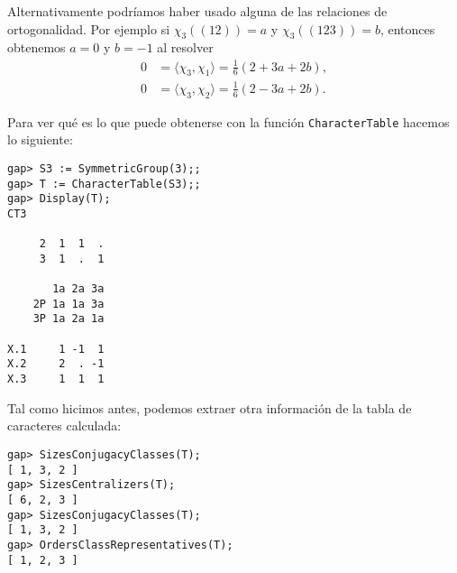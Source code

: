 \begin{example}
	Alternativamente podríamos haber usado alguna de las relaciones de
	ortogonalidad. Por ejemplo si $\chi_3( (12) )=a$ y $\chi_3( (123))=b$,
	entonces obtenemos $a=0$ y $b=-1$ al resolver 
	\begin{align*}
		0&=\langle \chi_3,\chi_1\rangle=\frac16(2+3a+2b),\\
		0&=\langle \chi_3,\chi_2\rangle=\frac16(2-3a+2b).
	\end{align*}
	
	Para ver qué es lo que puede obtenerse con la función \lstinline{CharacterTable} hacemos lo siguiente:
\begin{lstlisting}
gap> S3 := SymmetricGroup(3);;
gap> T := CharacterTable(S3);;
gap> Display(T);
CT3

     2  1  1  .
     3  1  .  1

       1a 2a 3a
    2P 1a 1a 3a
    3P 1a 2a 1a

X.1     1 -1  1
X.2     2  . -1
X.3     1  1  1
\end{lstlisting}
Tal como hicimos antes, podemos extraer otra información de la tabla de caracteres calculada:
\begin{lstlisting}
gap> SizesConjugacyClasses(T);
[ 1, 3, 2 ]
gap> SizesCentralizers(T);
[ 6, 2, 3 ]
gap> SizesConjugacyClasses(T);
[ 1, 3, 2 ]
gap> OrdersClassRepresentatives(T);
[ 1, 2, 3 ]
\end{lstlisting}
\end{example}

